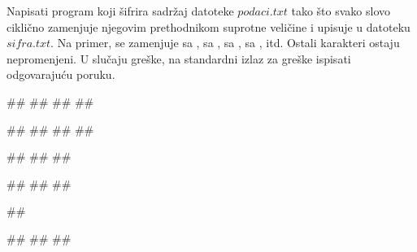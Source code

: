 \begin{Exercise}[label=p3_id17]         
Napisati program koji šifrira sadržaj datoteke $podaci.txt$ tako što svako slovo ciklično 
zamenjuje njegovim prethodnikom suprotne veličine i upisuje u datoteku $sifra.txt$. 
Na primer,  se zamenjuje sa ,
 sa ,  sa ,  sa
, itd. Ostali karakteri ostaju nepromenjeni. 
U slučaju greške, na standardni izlaz za greške ispisati odgovarajuću poruku.

\begin{minitest}
\begin{upotreba}{1}
##
##
##
##

##
##
##
##
\end{upotreba}
\end{minitest}
\begin{minitest}
\begin{upotreba}{2}
##
##
##

##
##
##
\end{upotreba}
\end{minitest}
\begin{minitest}
\begin{upotreba}{3}
##

#\naslovIzlazZaGresku#
##
##
\end{upotreba}
\end{minitest}
\end{Exercise}
\begin{Answer}[ref=p3_id17]
\end{Answer}


